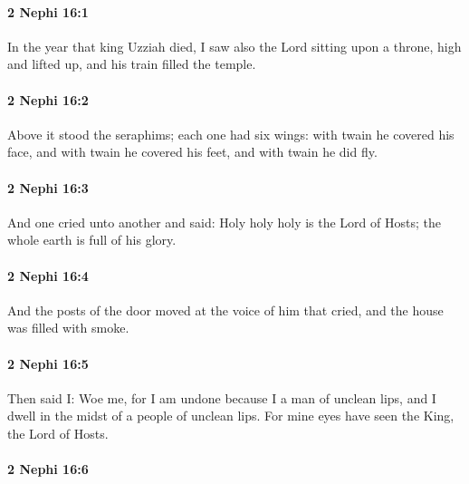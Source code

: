 		\paragraph{2 Nephi 16:1} %
			\label{2NEPHI-16-1}

			In the year that king Uzziah died,
			I saw also the Lord sitting upon a throne, high and lifted up,
			and his train filled the temple.

		\paragraph{2 Nephi 16:2} %
			\label{2NEPHI-16-2}

			Above it stood the seraphims;
			each one had six wings:
			with twain he covered his face,
			and with twain he covered his feet,
			and with twain he did fly.

		\paragraph{2 Nephi 16:3} %
			\label{2NEPHI-16-3}

			And one cried unto another and said:
			Holy holy holy is the Lord of Hosts;
			the whole earth is full of his glory.

		\paragraph{2 Nephi 16:4} %
			\label{2NEPHI-16-4}

			And the posts of the door moved at the voice of him that cried,
			and the house was filled with smoke.

		\paragraph{2 Nephi 16:5} %
			\label{2NEPHI-16-5}

			Then said I:
			Woe me, for I am undone
			because I a man of unclean lips,
			and I dwell in the midst of a people of unclean lips.
			For mine eyes have seen the King, the Lord of Hosts.

		\paragraph{2 Nephi 16:6} %
			\label{2NEPHI-16-6}

